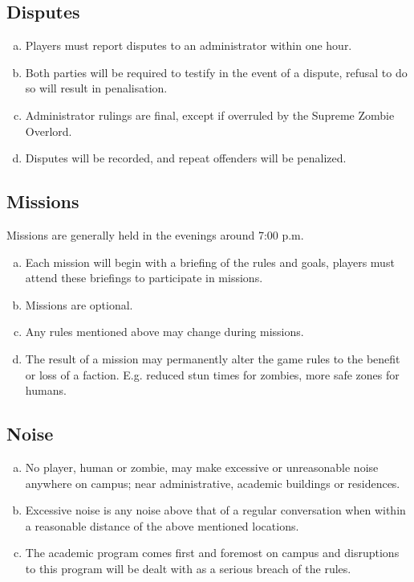 \documentclass[a4paper,12pt]{article}
\begin{document}
\subsection{Disputes}
\begin{enumerate}[(a)]
    \item Players must report disputes to an administrator within one hour.
    \item Both parties will be required to testify in the event of a dispute, refusal to do so will result in penalisation.
    \item Administrator rulings are final, except if overruled by the Supreme Zombie Overlord.
    \item Disputes will be recorded, and repeat offenders will be penalized. 
\end{enumerate}

\subsection{Missions}
Missions are generally held in the evenings around 7:00 p.m.
\begin{enumerate}[(a)]
	\item Each mission will begin with a briefing of the rules and goals, players must attend these briefings to participate in missions.
	\item Missions are optional.
	\item Any rules mentioned above may change during missions.
	\item The result of a mission may permanently alter the game rules to the benefit or loss of a faction. E.g. reduced stun times for zombies, more safe zones for humans.
\end{enumerate}

\subsection{Noise}
\begin{enumerate}[(a)]
	\item No player, human or zombie, may make excessive or unreasonable noise anywhere on campus; near administrative, academic buildings or residences.
	\item Excessive noise is any noise above that of a regular conversation when within a reasonable distance of the above mentioned locations.
    \item The academic program comes first and foremost on campus and disruptions to this program will be dealt with as a serious breach of the rules.
\end{enumerate}
\end{document}
